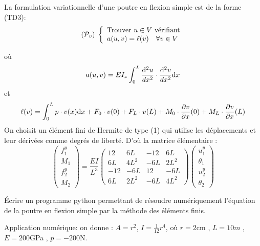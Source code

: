 \documentclass[11pt]{article}
\def \de {{\rm d}}
\begin{document}
La formulation variationnelle d'une poutre en flexion simple est de la forme (TD3):
\[
({\cal P}_v)\;\left\{
\begin{array}{l}
\mbox{Trouver } u\in V \mbox{ vérifiant}\\
a(u,v)=\ell(v)\quad \forall v\in V
\end{array}
\right.
\]

où \[ a(u,v)=\displaystyle EI_z\int_0^L\frac{\de^2 u}{dx^2}\cdot \frac{\de^2 v}{dx^2}\de x\]
et \[ \ell(v)=\displaystyle \int_0^L p\cdot v(x)\de x+F_0 \cdot v(0)+F_L \cdot v(L)+M_0 \cdot \frac{\partial v}{\partial x}(0)+M_L \cdot \frac{\partial v}{\partial x}(L)\]
On choisit un élément fini de Hermite de type (1) qui utilise les déplacements et leur dérivées comme degrés de liberté. D'où  la matrice élémentaire :
\[\left(\begin{array}{r} 
f_{1}^y\\M_1\\f_{2}^y\\M_2
\end{array}\right)=\frac{EI}{L^3}\left(\begin{array}{rrrr} 
12&6L&-12&6L\\
6L&4L^2&-6L&2L^2\\
-12&-6L&12&-6L\\
6L&2L^2&-6L&4L^2
\end{array}\right) \left(\begin{array}{l} 
u_{1}^y\\\theta_1\\u_{2}^y\\\theta_2
\end{array}\right)
\]

Écrire un programme python permettant de résoudre numériquement l'équation de la poutre en flexion simple par la méthode des éléments finis.

Application numérique:  on donne : $A=r^2$, $I=\frac{1}{12}r^4$, où $r=2\mbox{cm}$ , $L=10 m$ , $E=200$GPa , $p =-200$N.
 
\end{document}
